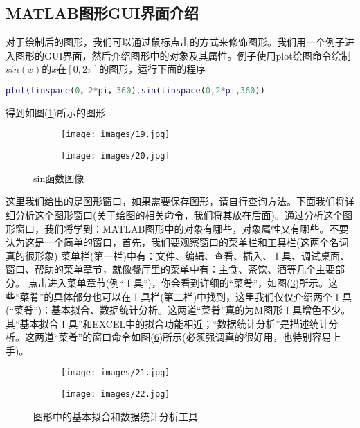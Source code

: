     \subsection{MATLAB图形GUI界面介绍}
        \par
        对于绘制后的图形，我们可以通过鼠标点击的方式来修饰图形。我们用一个例子进入图形的GUI界面，然后介绍图形中的对象及其属性。例子使用plot绘图命令绘制$sin(x)$的$x$在$[0,2\pi]$的图形，运行下面的程序
        \begin{lstlisting}[language = Matlab]
        plot(linspace(0，2*pi，360),sin(linspace(0,2*pi,360))
        \end{lstlisting}
        得到如图(\ref{sin函数图像1})所示的图形
        \begin{figure}[H]
        \centering
        \begin{subfigure}[b]{0.4\textwidth}
            \texttt{[image: images/19.jpg]}
            \caption{}
            \label{sin函数图像1}
        \end{subfigure}
        \begin{subfigure}[b]{0.4\textwidth}
            \texttt{[image: images/20.jpg]}
            \caption{}
            \label{sin函数图像2}
        \end{subfigure}
        \caption{sin函数图像}
        \end{figure}
        \par
        这里我们给出的是图形窗口，如果需要保存图形，请自行查询方法。下面我们将详细分析这个图形窗口(关于绘图的相关命令，我们将其放在后面)。通过分析这个图形窗口，我们将学到：MATLAB图形中的对象有哪些，对象属性又有哪些。不要认为这是一个简单的窗口，首先，我们要观察窗口的菜单栏和工具栏(这两个名词真的很形象)
        菜单栏(第一栏)中有：文件、编辑、查看、插入、工具、调试桌面、窗口、帮助的菜单章节，就像餐厅里的菜单中有：主食、茶饮、酒等几个主要部分。
        点击进入菜单章节(例“工具”)，你会看到详细的“菜肴”，如图(\ref{sin函数图像2})所示。这些“菜肴”的具体部分也可以在工具栏(第二栏)中找到，这里我们仅仅介绍两个工具(“菜肴”)：基本拟合、数据统计分析。这两道“菜肴”真的为M图形工具增色不少。其“基本拟合工具”和EXCEL中的拟合功能相近；“数据统计分析”是描述统计分析。这两道“菜肴”的窗口命令如图(\ref{图形中的基本拟合和数据统计分析工具})所示(必须强调真的很好用，也特别容易上手)。
        \begin{figure}[H]
        \centering
        \begin{subfigure}[b]{0.2\textwidth}
            \texttt{[image: images/21.jpg]}
            \caption{}
            \label{基本拟合}
        \end{subfigure}
        \begin{subfigure}[b]{0.4\textwidth}
            \texttt{[image: images/22.jpg]}
            \caption{}
            \label{数据统计分析}
        \end{subfigure}
        \caption{图形中的基本拟合和数据统计分析工具}
        \label{图形中的基本拟合和数据统计分析工具}
        \end{figure}
